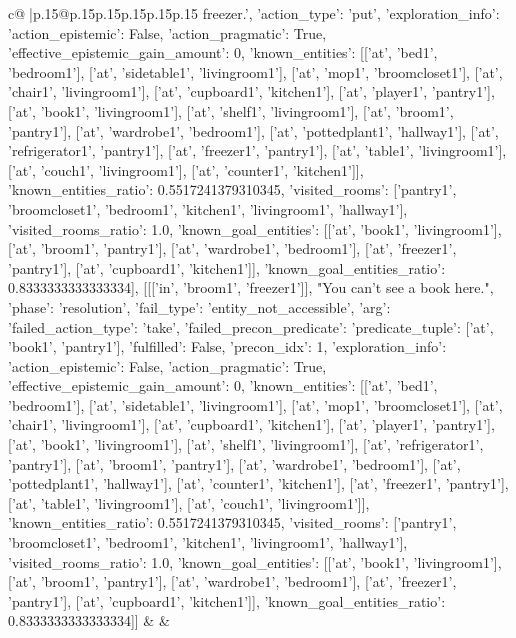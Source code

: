 \documentclass{article}
\begin{document}
{\begin{supertabular}{c@{$\;$}|p{.15\linewidth}@{}p{.15\linewidth}p{.15\linewidth}p{.15\linewidth}p{.15\linewidth}p{.15\linewidth}}
{{{freezer.', {'action_type': 'put', 'exploration_info': {'action_epistemic': False, 'action_pragmatic': True, 'effective_epistemic_gain_amount': 0, 'known_entities': [['at', 'bed1', 'bedroom1'], ['at', 'sidetable1', 'livingroom1'], ['at', 'mop1', 'broomcloset1'], ['at', 'chair1', 'livingroom1'], ['at', 'cupboard1', 'kitchen1'], ['at', 'player1', 'pantry1'], ['at', 'book1', 'livingroom1'], ['at', 'shelf1', 'livingroom1'], ['at', 'broom1', 'pantry1'], ['at', 'wardrobe1', 'bedroom1'], ['at', 'pottedplant1', 'hallway1'], ['at', 'refrigerator1', 'pantry1'], ['at', 'freezer1', 'pantry1'], ['at', 'table1', 'livingroom1'], ['at', 'couch1', 'livingroom1'], ['at', 'counter1', 'kitchen1']], 'known_entities_ratio': 0.5517241379310345, 'visited_rooms': ['pantry1', 'broomcloset1', 'bedroom1', 'kitchen1', 'livingroom1', 'hallway1'], 'visited_rooms_ratio': 1.0, 'known_goal_entities': [['at', 'book1', 'livingroom1'], ['at', 'broom1', 'pantry1'], ['at', 'wardrobe1', 'bedroom1'], ['at', 'freezer1', 'pantry1'], ['at', 'cupboard1', 'kitchen1']], 'known_goal_entities_ratio': 0.8333333333333334}}], [[['in', 'broom1', 'freezer1']], "You can't see a book here.", {'phase': 'resolution', 'fail_type': 'entity_not_accessible', 'arg': {'failed_action_type': 'take', 'failed_precon_predicate': {'predicate_tuple': ['at', 'book1', 'pantry1'], 'fulfilled': False, 'precon_idx': 1}}, 'exploration_info': {'action_epistemic': False, 'action_pragmatic': True, 'effective_epistemic_gain_amount': 0, 'known_entities': [['at', 'bed1', 'bedroom1'], ['at', 'sidetable1', 'livingroom1'], ['at', 'mop1', 'broomcloset1'], ['at', 'chair1', 'livingroom1'], ['at', 'cupboard1', 'kitchen1'], ['at', 'player1', 'pantry1'], ['at', 'book1', 'livingroom1'], ['at', 'shelf1', 'livingroom1'], ['at', 'refrigerator1', 'pantry1'], ['at', 'broom1', 'pantry1'], ['at', 'wardrobe1', 'bedroom1'], ['at', 'pottedplant1', 'hallway1'], ['at', 'counter1', 'kitchen1'], ['at', 'freezer1', 'pantry1'], ['at', 'table1', 'livingroom1'], ['at', 'couch1', 'livingroom1']], 'known_entities_ratio': 0.5517241379310345, 'visited_rooms': ['pantry1', 'broomcloset1', 'bedroom1', 'kitchen1', 'livingroom1', 'hallway1'], 'visited_rooms_ratio': 1.0, 'known_goal_entities': [['at', 'book1', 'livingroom1'], ['at', 'broom1', 'pantry1'], ['at', 'wardrobe1', 'bedroom1'], ['at', 'freezer1', 'pantry1'], ['at', 'cupboard1', 'kitchen1']], 'known_goal_entities_ratio': 0.8333333333333334}}]] 
	  } 
	   } 
	   } 
	 & & \\ 
 

    \theutterance {}  


\end{supertabular}}
\end{document}
